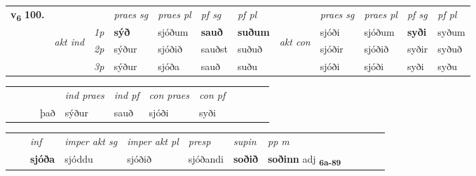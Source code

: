 \begin{tabular}{llllllllllll} \toprule
\multirow{4}{*}{{{\textbf{v{\textsubscript{6}}} \Large{\textbf{100.}}}}}  & &   &  \textit{praes sg}  & \textit{praes pl}  &\textit{ pf sg} & \textit{pf pl} &  &  \textit{praes sg}  & \textit{praes pl}  & \textit{pf sg} & \textit{pf pl } \\*
	\cmidrule{4-7} \cmidrule{9-12}
 & \multirow{3}{*}{\begin{turn}{90}\textit{akt ind}\end{turn}} & {\textit{1p}} & \textbf{sýð} & sjóðum    & \textbf{sauð} & \textbf{suðum} & \multirow{3}{*}{\begin{turn}{90}\textit{akt con}\end{turn}} &sjóði & sjóðum & \textbf{syði} & syðum\\*
& &  {\textit{2p}} &  sýður  & sjóðið   & sauðst & suðuð & & sjóðir & sjóðið & syðir & syðuð \\*
& &  {\textit{3p}} & sýður & sjóða   & sauð & suðu & & sjóði & sjóði& syði & syðu  \\*
\cmidrule{4-7} \cmidrule{9-12}
\end{tabular}


\begin{tabular}{llllllllllll}
 & &  & &  \textit{ind praes} & \textit{ind pf} & \textit{con praes} & \textit{con pf} \\*
&  & & það & sýður & sauð & sjóði & syði \\*
\cmidrule{5-9}
\end{tabular}


\begin{tabular}{llllllllllll}
 & & \textit{inf} & \textit{imper akt sg} & \textit{imper akt pl}   & \textit{presp} & \textit{supin}  & \textit{pp m}     \\*
  & & \textbf{sjóða} & sjóddu  & sjóðið   & sjóðandi &  \textbf{soðið}  & \textbf{soðinn} adj \textbf{\textsubscript{6a-89}} \\*
\cmidrule{1-12}
\end{tabular}




